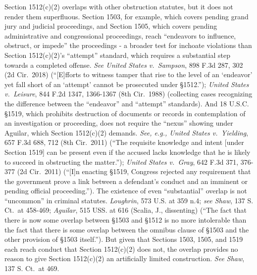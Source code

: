 Section 1512(c)(2) overlaps with other obstruction statutes, but it does not render them superfluous.
Section 1503, for example, which covers pending grand jury and judicial proceedings, and Section 1505, which covers pending administrative and congressional proceedings, reach “endeavors to influence, obstruct, or impede” the proceedings - a broader test for inchoate violations than Section 1512(c)(2)’s “attempt” standard, which requires a substantial step towards a completed offense.
\textit{See United States v.\ Sampson}, 898 F.3d 287, 302 (2d Cir.~2018) (“[E]fforts to witness tamper that rise to the level of an ‘endeavor’ yet fall short of an ‘attempt’ cannot be prosecuted under \S 1512.”);
\textit{United States v.\ Leisure}, 844 F.2d 1347, 1366-1367 (8th Cir.~1988) (collecting cases recognizing the difference between the “endeavor” and “attempt” standards).
And 18 U.S.C. \S 1519, which prohibits destruction of documents or records in contemplation of an investigation or proceeding, does not require the “nexus” showing under Aguilar, which Section 1512(c)(2) demands.
\textit{See, e.g., United States v.\ Yielding}, 657 F.3d 688, 712 (8th Cir.~2011) (“The requisite knowledge and intent [under Section 1519] can be present even if the accused lacks knowledge that he is likely to succeed in obstructing the matter.”);
\textit{United States v.\ Gray}, 642 F.3d 371, 376-377 (2d Cir.~2011) (“[I]n enacting \S 1519, Congress rejected any requirement that the government prove a link between a defendant’s conduct and an imminent or pending official proceeding.”).
The existence of even “substantial” overlap is not “uncommon” in criminal statutes.
\textit{Loughrin}, 573 U.S. at 359 n.4;
\textit{see Shaw}, 137 S. Ct.~at 458-469;
\textit{Aguilar}, 515 USS. at 616 (Scalia, J., dissenting) (“The fact that there is now some overlap between \S 1503 and \S 1512 is no more intolerable than the fact that there is some overlap between the omnibus clause of \S 1503 and the other provision of \S 1503 itself.”).
But given that Sections 1503, 1505, and 1519 each reach conduct that Section 1512(c)(2) does not, the overlap provides no reason to give Section 1512(c)(2) an artificially limited construction.
\textit{See Shaw}, 137 S. Ct.~at 469.%
